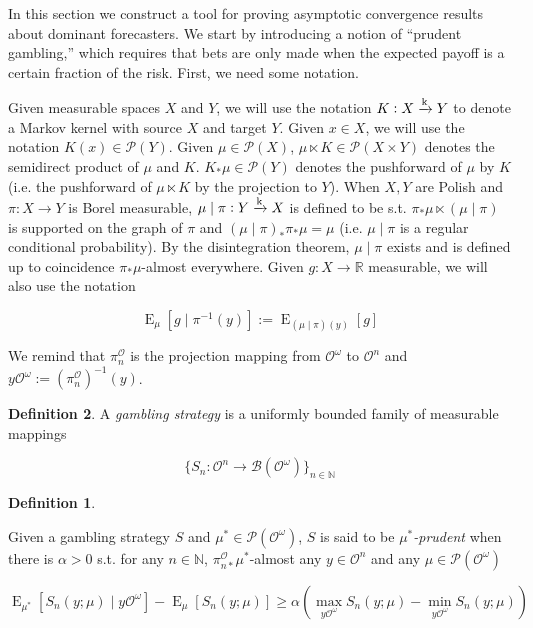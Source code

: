 \documentclass[11pt]{article}
\theoremstyle{definition}
\newtheorem{definition}{Definition}%
\theoremstyle{plain}
\newcommand{\Nats}{\mathbb{N}}
\newcommand{\Reals}{\mathbb{R}}
\newcommand{\Sq}[2]{\{#1\}_{#2 \in \Nats}}
\newcommand{\Sqn}[1]{\Sq{#1}{n}}
\DeclareMathOperator{\E}{E}
\newcommand{\M}{\xrightarrow{\textnormal{k}}}
\newcommand{\PM}{\mathcal{P}}
\newcommand{\Ob}{\mathcal{O}}
\newcommand{\OO}{\Ob^\omega}
\newcommand{\PO}{\pi^\Ob}
\newcommand{\PMO}{\PM(\OO)}
\newcommand{\Gm}{\mathcal{B}}
\newcommand{\GMO}{\Gm(\OO)}
\begin{document}
In this section we construct a tool for proving asymptotic convergence results about dominant forecasters. We start by introducing a notion of \enquote{prudent gambling,} which requires that bets are only made when the expected payoff is a certain fraction of the risk. First, we need some notation.

Given measurable spaces $X$ and $Y$, we will use the notation $K: X \M Y$ to denote a Markov kernel with source $X$ and target $Y$. Given $x \in X$, we will use the notation $K\left(x\right) \in \PM\left(Y\right)$. Given $\mu \in \PM\left(X\right)$, $\mu \ltimes K \in \PM\left(X \times Y\right)$ denotes the semidirect product of $\mu$ and $K$. $K_* \mu \in \PM\left(Y\right)$ denotes the pushforward of $\mu$ by $K$ (i.e. the pushforward of $\mu \ltimes K$ by the projection to $Y$). When $X,Y$ are Polish and $\pi: X \rightarrow Y$ is Borel measurable, $\mu \mid \pi: Y \M X$ is defined to be s.t. $\pi_* \mu \ltimes \left(\mu \mid \pi\right)$ is supported on the graph of $\pi$ and $\left(\mu \mid \pi\right)_* \pi_* \mu = \mu$ (i.e. $\mu \mid \pi$ is a regular conditional probability). By the disintegration theorem, $\mu \mid \pi$ exists and is defined up to coincidence $\pi_* \mu$-almost everywhere. Given $g: X \rightarrow \Reals$ measurable, we will also use the notation 

\begin{equation}
\E_{\mu}[g \mid \pi^{-1}\left(y\right)]:=\E_{\left(\mu \mid \pi\right)\left(y\right)}[g]
\end{equation}

We remind that $\PO_n$ is the projection mapping from $\OO$ to $\Ob^n$ and $y\OO:= \left(\PO_{n}\right)^{-1}\left(y\right)$.

\begin{definition}

A \emph{gambling strategy} is a uniformly bounded family of measurable mappings

\[\Sqn{S_n: \Ob^n \rightarrow \GMO}\]

\begin{definition}
\label{def:prudent}

Given a gambling strategy $S$ and $\mu^* \in \PMO$, $S$ is said to be \emph{$\mu^*$-prudent} when there is $\alpha > 0$ s.t. for any $n \in \Nats$, $\PO_{n*} \mu^*$-almost any $y \in \Ob^n$ and any $\mu \in \PMO$

\begin{equation}
\E_{\mu^*}[S_n\left(y; \mu\right) \mid y\OO] - \E_\mu[S_n\left(y; \mu\right)] \geq \alpha \left(\max_{y\OO}{S_n\left(y; \mu\right)} - \min_{y\OO}{S_n\left(y; \mu\right)}\right)
\end{equation}

\end{definition}

\end{definition}
\end{document}
